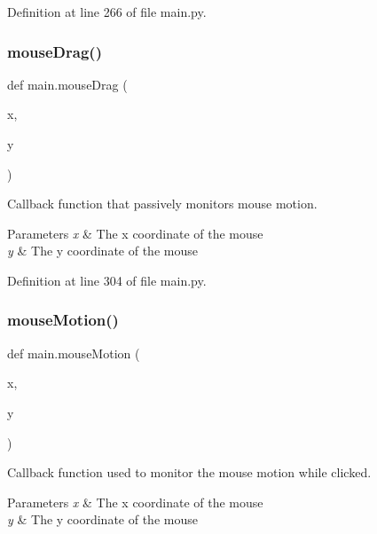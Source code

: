 Definition at line 266 of file main.\+py.

\mbox{\label{namespacemain_a33eac5e1e174927a801f847ff8c2d484}} 
\subsubsection{\texorpdfstring{mouse\+Drag()}{mouseDrag()}}
{\footnotesize\ttfamily def main.\+mouse\+Drag (\begin{DoxyParamCaption}\item[{}]{x,  }\item[{}]{y }\end{DoxyParamCaption})}



Callback function that passively monitors mouse motion. 


\begin{DoxyParams}{Parameters}
{\em x} & The x coordinate of the mouse \\
\hline
{\em y} & The y coordinate of the mouse \\
\hline
\end{DoxyParams}


Definition at line 304 of file main.\+py.

\mbox{\label{namespacemain_aac29b4e8c9fa3c64c062e76290492fb8}} 
\subsubsection{\texorpdfstring{mouse\+Motion()}{mouseMotion()}}
{\footnotesize\ttfamily def main.\+mouse\+Motion (\begin{DoxyParamCaption}\item[{}]{x,  }\item[{}]{y }\end{DoxyParamCaption})}



Callback function used to monitor the mouse motion while clicked. 


\begin{DoxyParams}{Parameters}
{\em x} & The x coordinate of the mouse \\
\hline
{\em y} & The y coordinate of the mouse \\
\hline
\end{DoxyParams}



